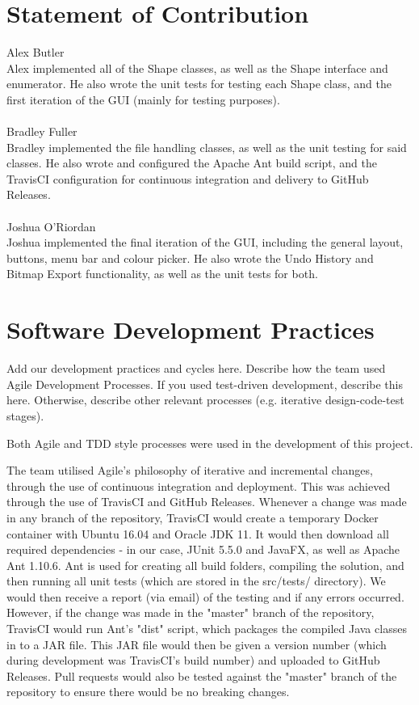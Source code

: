 \documentclass[12pt]{article} %
\begin{document}
\newpage

\section{Statement of Contribution}

{\large Alex Butler}\\
Alex implemented all of the Shape classes, as well as the Shape interface and enumerator. He also wrote the unit tests for testing each Shape class, and the first iteration of the GUI (mainly for testing purposes). 
\\\\{\large Bradley Fuller}\\
Bradley implemented the file handling classes, as well as the unit testing for said classes. He also wrote and configured the Apache Ant build script, and the TravisCI configuration for continuous integration and delivery to GitHub Releases.
\\\\{\large Joshua O'Riordan}\\
Joshua implemented the final iteration of the GUI, including the general layout, buttons, menu bar and colour picker. He also wrote the Undo History and Bitmap Export functionality, as well as the unit tests for both.

\newpage

\section{Software Development Practices}

Add our development practices and cycles here. Describe how the team used Agile Development Processes. If you used test-driven development, describe this here. Otherwise, describe other relevant processes (e.g. iterative design-code-test stages).

Both Agile and TDD style processes were used in the development of this project.

The team utilised Agile's philosophy of iterative and incremental changes, through the use of continuous integration and deployment. This was achieved through the use of TravisCI and GitHub Releases. Whenever a change was made in any branch of the repository, TravisCI would create a temporary Docker container with Ubuntu 16.04 and Oracle JDK 11. It would then download all required dependencies - in our case, JUnit 5.5.0 and JavaFX, as well as Apache Ant 1.10.6. Ant is used for creating all build folders, compiling the solution, and then running all unit tests (which are stored in the src/tests/ directory). We would then receive a report (via email) of the testing and if any errors occurred. However, if the change was made in the "master" branch of the repository, TravisCI would run Ant's "dist" script, which packages the compiled Java classes in to a JAR file. This JAR file would then be given a version number (which during development was TravisCI's build number) and uploaded to GitHub Releases. Pull requests would also be tested against the "master" branch of the repository to ensure there would be no breaking changes.
\end{document}
